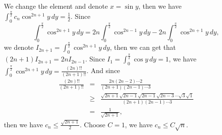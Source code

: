 \documentclass[12pt,a4paper]{ctexart}
\begin{document}
We change the element and denote $x = \sin y$, then we have $\int_{0}^{\frac{\pi}{2}}  c_{n} \cos^{2n+1}y \, d y = \frac{1}{2}$. Since 
\begin{equation*}
   \int_{0}^{\frac{\pi}{2}} \cos^{2n+1}y \, d y = 2n \int_{0}^{\frac{\pi}{2}} \cos^{2n-1}y \, d y - 2n \int_{0}^{\frac{\pi}{2}} \cos^{2n+1}y \, d y,
\end{equation*}
we denote $I_{2n + 1} = \int_{0}^{\frac{\pi}{2}} \cos^{2n+1}y \, d y$, then we can get that $(2n + 1)I_{2n+1} = 2n I_{2n-1}$. Since $I_{1} = \int_{0}^{\frac{\pi}{2}} \cos y \, d y = 1$, we have $\int_{0}^{\frac{\pi}{2}} \cos^{2n+1}y \, d y = \frac{(2n)!!}{(2n+1)!!}$. And since
\begin{eqnarray*}
\frac{(2n)!!}{(2n+1)!!} &=&  \frac{2n (2n-2) \cdots 2}{(2n+1) (2n-1) \cdots 3}  \\
            &\geq& \frac{\sqrt{2n+1}\sqrt{2n-1}\sqrt{2n-1}\sqrt{2n-3} \cdots \sqrt{3}\sqrt{1}}{(2n+1) (2n-1) \cdots 3} \\
            &=& \frac{1}{\sqrt{2n+1}},
\end{eqnarray*}
then we have $c_{n} \leq \frac{\sqrt{2n+1}}{2}$. Choose $C = 1$, we have $c_{n} \leq C \sqrt{n}$.
\end{document}

